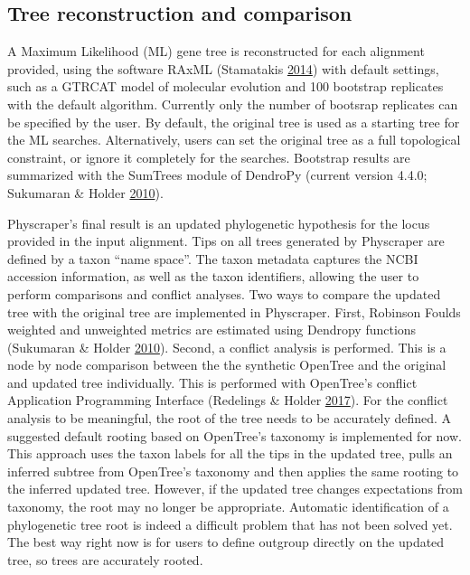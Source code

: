 \documentclass[]{article}
\begin{document}
\hypertarget{tree-reconstruction-and-comparison}{%
\subsection{Tree reconstruction and comparison}\label{tree-reconstruction-and-comparison}}

A Maximum Likelihood (ML) gene tree is reconstructed for each alignment provided, using the software RAxML (Stamatakis \protect\hyperlink{ref-stamatakis2014raxml}{2014}) with default settings, such as a GTRCAT model of molecular evolution and 100 bootstrap replicates with the default algorithm. Currently only the number of bootsrap replicates can be specified by the user.
By default, the original tree is used as a starting tree for the ML searches. Alternatively, users can set the original tree as a full topological constraint, or ignore it completely for the searches.
Bootstrap results are summarized with the SumTrees module of DendroPy (current version 4.4.0; Sukumaran \& Holder \protect\hyperlink{ref-sukumaran2010dendropy}{2010}).

Physcraper's final result is an updated phylogenetic hypothesis for the locus provided in the input alignment.
Tips on all trees generated by Physcraper are defined by a taxon ``name space''. The taxon metadata captures the NCBI accession information, as well as the taxon identifiers, allowing the user to perform comparisons and conflict analyses.
Two ways to compare the updated tree with the original tree are implemented in Physcraper. First, Robinson Foulds weighted and unweighted metrics are estimated using Dendropy functions (Sukumaran \& Holder \protect\hyperlink{ref-sukumaran2010dendropy}{2010}).
Second, a conflict analysis is performed. This is a node by node comparison between the the synthetic OpenTree and the original and updated tree individually. This is performed with OpenTree's conflict Application Programming Interface (Redelings \& Holder \protect\hyperlink{ref-redelings2017supertree}{2017}).
For the conflict analysis to be meaningful, the root of the tree needs to be accurately defined. A suggested default rooting based on OpenTree's taxonomy is implemented for now. This approach uses the taxon labels for all the tips in the updated tree, pulls an inferred subtree from OpenTree's taxonomy and then applies the same rooting to the inferred updated tree. However, if the updated tree changes expectations from taxonomy, the root may no longer be appropriate. Automatic identification of a phylogenetic tree root is indeed a difficult problem that has not been solved yet. The best way right now is for users to define outgroup directly on the updated tree, so trees are accurately rooted.
\end{document}
